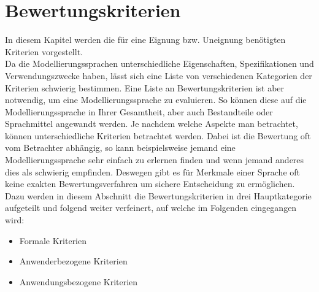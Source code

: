 

\chapter{Bewertungskriterien}
\label{ch:Bewertungskriterien}
In diesem Kapitel werden die für eine Eignung bzw. Uneignung benötigten Kriterien vorgestellt.\\ 
Da die Modellierungssprachen unterschiedliche Eigenschaften, Spezifikationen und Verwendungszwecke haben, lässt sich eine Liste von verschiedenen Kategorien der Kriterien schwierig bestimmen.
Eine Liste an Bewertungskriterien ist aber notwendig, um eine Modellierungssprache zu evaluieren.
So können diese auf die Modellierungssprache in Ihrer Gesamtheit, aber auch Bestandteile oder Sprachmittel angewandt werden.  Je nachdem welche Aspekte man betrachtet, können unterschiedliche Kriterien betrachtet werden.
Dabei ist die Bewertung oft vom Betrachter abhängig, so kann beispielsweise jemand eine Modellierungssprache sehr einfach zu erlernen finden und wenn jemand anderes dies als schwierig empfinden. Deswegen gibt es für Merkmale einer Sprache oft keine exakten Bewertungsverfahren um sichere Entscheidung zu ermöglichen.\\
Dazu werden in diesem Abschnitt die Bewertungskriterien in drei Hauptkategorie aufgeteilt und folgend weiter verfeinert, auf welche im Folgenden eingegangen wird: 

\begin{itemize}
	\item Formale Kriterien
	\item Anwenderbezogene Kriterien
	\item Anwendungsbezogene Kriterien
\end{itemize}





